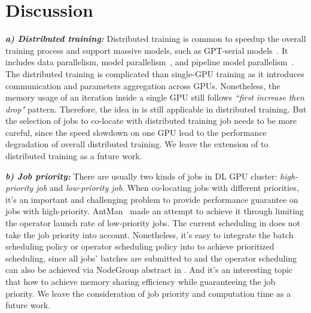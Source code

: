 \section{Discussion}
\setlength{\parindent}{2em}\textbf{\textit{a) Distributed training:}}
Distributed training is common to speedup the overall training process
and support massive models, such as GPT-serial models~\cite{radford2019language,brown2020language}.
It includes data parallelism, model parallelism~\cite{shoeybi2019megatron}, and pipeline model parallelism~\cite{ghuangGpipeEfficientTraining2019,narayanan2019pipedream,eliad2021fine}.
The distributed training is complicated than single-GPU training
as it introduces communication and parameters aggregation across GPUs.
Nonetheless, the memory usage of an iteration inside a single GPU still follows \emph{``first increase then drop"} pattern.
Therefore, the idea in \oursys{} is still applicable in distributed training.
But the selection of jobs to co-locate with distributed training job needs to be more careful,
since the speed slowdown on one GPU lead to the performance degradation of overall distributed training.
We leave the extension of \oursys{} to distributed training as a future work.

\textbf{\textit{b) Job priority:}}
There are usually two kinds of jobs in DL GPU cluster: \emph{high-priority job} and \emph{low-priority job}.
When co-locating jobs with different priorities,
it's an important and challenging problem to provide performance guarantee on jobs with high-priority.
AntMan~\cite{xiao2020antman} made an attempt to achieve it through limiting the operator launch rate of low-priority jobs.
The current scheduling in \oursys{} does not take the job priority into account.
Nonetheless, it's easy to integrate the batch scheduling policy or operator scheduling policy into \oursys{} to achieve prioritized scheduling,
since all jobs' batches are submitted to \oursys{} and the operator scheduling can also be achieved via NodeGroup abstract in \oursys{}.
And it's an interesting topic that how to achieve memory sharing efficiency while guaranteeing the job priority.
We leave the consideration of job priority and computation time as a future work.

